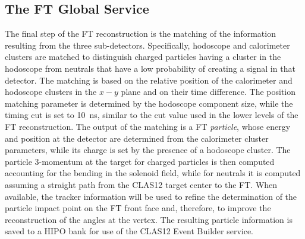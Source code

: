 \subsection{The FT Global Service}

The final step of the FT reconstruction is the matching of the information resulting from the three sub-detectors.
Specifically, hodoscope and calorimeter clusters are matched to distinguish charged particles having a cluster in the
hodoscope from neutrals that have a low probability of creating a signal in that detector. The matching is based on
the relative position of the calorimeter and hodoscope clusters in the $x-y$ plane and on their time difference. The
position matching parameter is determined by the hodoscope component size, while the timing cut is set to 10~ns,
similar to the cut value used in the lower levels of the FT reconstruction. The output of the matching is a FT
{\it particle}, whose energy and position at the detector are determined from the calorimeter cluster parameters,
while its charge is set by the presence of a hodoscope cluster. The particle 3-momentum at the target for charged
particles is then computed accounting for the bending in the solenoid field, while for neutrals it is computed assuming
a straight path from the CLAS12 target center to the FT. When available, the tracker information will be used to
refine the determination of the particle impact point on the FT front face and, therefore, to improve the
reconstruction of the angles at the vertex. The resulting particle information is saved to a HIPO bank for use of
the CLAS12 Event Builder service.
